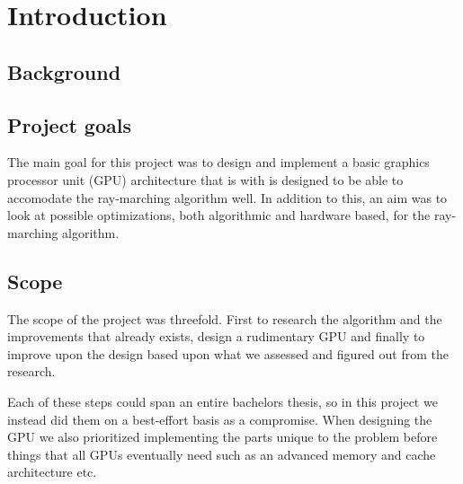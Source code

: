 \chapter{Introduction} 
	
	\section{Background}
	
	\section{Project goals}
		
		The main goal for this project was to design and implement a basic
		graphics processor unit (GPU) architecture that is with is designed to
		be able to accomodate the ray-marching algorithm well. In addition to
		this, an aim was to look at possible optimizations, both algorithmic
		and hardware based, for the ray-marching algorithm.
		
	\section{Scope}
		
		The scope of the project was threefold. First to research the algorithm and
		the improvements that already exists, design a rudimentary GPU and
		finally to improve upon the design based upon what we assessed and figured
		out from the research.

		Each of these steps could span an entire bachelors thesis, so in this 
		project we instead did them on a best-effort basis as a compromise.
		When designing the GPU we also prioritized implementing the parts unique to the
		problem before things that all GPUs eventually need such as an advanced 
		memory and cache architecture etc.
